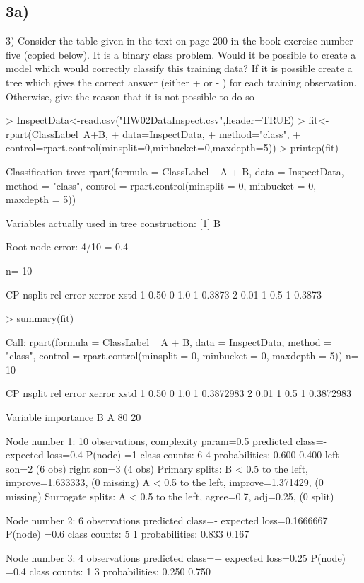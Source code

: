 \documentclass{article}
\begin{document}
\subsection*{3a)}
3) Consider the table given in the text on page 200 in the book exercise
number five (copied below). It is a binary class problem. Would it be possible
to create a model which would correctly classify this training data? If it is
possible create a tree which gives the correct answer (either + or - ) for each
training observation. Otherwise, give the reason that it is not possible to do
so
\begin{Schunk}
\begin{Sinput}
> InspectData<-read.csv("HW02DataInspect.csv",header=TRUE)
> fit<-rpart(ClassLabel~A+B, 
+       data=InspectData, 
+       method="class",
+       control=rpart.control(minsplit=0,minbucket=0,maxdepth=5))
> printcp(fit)
\end{Sinput}
\begin{Soutput}
Classification tree:
rpart(formula = ClassLabel ~ A + B, data = InspectData, method = "class", 
    control = rpart.control(minsplit = 0, minbucket = 0, maxdepth = 5))

Variables actually used in tree construction:
[1] B

Root node error: 4/10 = 0.4

n= 10 

    CP nsplit rel error xerror   xstd
1 0.50      0       1.0      1 0.3873
2 0.01      1       0.5      1 0.3873
\end{Soutput}
\begin{Sinput}
> summary(fit)
\end{Sinput}
\begin{Soutput}
Call:
rpart(formula = ClassLabel ~ A + B, data = InspectData, method = "class", 
    control = rpart.control(minsplit = 0, minbucket = 0, maxdepth = 5))
  n= 10 

    CP nsplit rel error xerror      xstd
1 0.50      0       1.0      1 0.3872983
2 0.01      1       0.5      1 0.3872983

Variable importance
 B  A 
80 20 

Node number 1: 10 observations,    complexity param=0.5
  predicted class=-  expected loss=0.4  P(node) =1
    class counts:     6     4
   probabilities: 0.600 0.400 
  left son=2 (6 obs) right son=3 (4 obs)
  Primary splits:
      B < 0.5 to the left,  improve=1.633333, (0 missing)
      A < 0.5 to the left,  improve=1.371429, (0 missing)
  Surrogate splits:
      A < 0.5 to the left,  agree=0.7, adj=0.25, (0 split)

Node number 2: 6 observations
  predicted class=-  expected loss=0.1666667  P(node) =0.6
    class counts:     5     1
   probabilities: 0.833 0.167 

Node number 3: 4 observations
  predicted class=+  expected loss=0.25  P(node) =0.4
    class counts:     1     3
   probabilities: 0.250 0.750 
\end{Soutput}
\end{Schunk}
\end{document}
